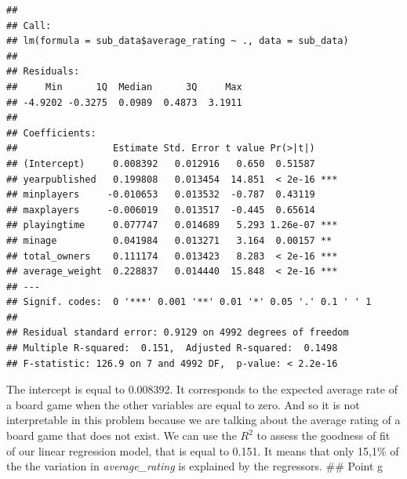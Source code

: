 \documentclass[
]{article}
\newenvironment{Shaded}{\begin{snugshade}}{\end{snugshade}}
\newcommand{\AttributeTok}[1]{\textcolor[rgb]{0.77,0.63,0.00}{#1}}
\newcommand{\ConstantTok}[1]{\textcolor[rgb]{0.00,0.00,0.00}{#1}}
\newcommand{\DecValTok}[1]{\textcolor[rgb]{0.00,0.00,0.81}{#1}}
\newcommand{\FunctionTok}[1]{\textcolor[rgb]{0.00,0.00,0.00}{#1}}
\newcommand{\NormalTok}[1]{#1}
\newcommand{\OtherTok}[1]{\textcolor[rgb]{0.56,0.35,0.01}{#1}}
\newcommand{\SpecialCharTok}[1]{\textcolor[rgb]{0.00,0.00,0.00}{#1}}
\begin{document}
\begin{Shaded}
\end{Shaded}

\begin{verbatim}
## 
## Call:
## lm(formula = sub_data$average_rating ~ ., data = sub_data)
## 
## Residuals:
##     Min      1Q  Median      3Q     Max 
## -4.9202 -0.3275  0.0989  0.4873  3.1911 
## 
## Coefficients:
##                 Estimate Std. Error t value Pr(>|t|)    
## (Intercept)     0.008392   0.012916   0.650  0.51587    
## yearpublished   0.199808   0.013454  14.851  < 2e-16 ***
## minplayers     -0.010653   0.013532  -0.787  0.43119    
## maxplayers     -0.006019   0.013517  -0.445  0.65614    
## playingtime     0.077747   0.014689   5.293 1.26e-07 ***
## minage          0.041984   0.013271   3.164  0.00157 ** 
## total_owners    0.111174   0.013423   8.283  < 2e-16 ***
## average_weight  0.228837   0.014440  15.848  < 2e-16 ***
## ---
## Signif. codes:  0 '***' 0.001 '**' 0.01 '*' 0.05 '.' 0.1 ' ' 1
## 
## Residual standard error: 0.9129 on 4992 degrees of freedom
## Multiple R-squared:  0.151,  Adjusted R-squared:  0.1498 
## F-statistic: 126.9 on 7 and 4992 DF,  p-value: < 2.2e-16
\end{verbatim}

The intercept is equal to 0.008392. It corresponds to the expected
average rate of a board game when the other variables are equal to zero.
And so it is not interpretable in this problem because we are talking
about the average rating of a board game that does not exist. We can use
the \(R^2\) to assess the goodness of fit of our linear regression
model, that is equal to 0.151. It means that only 15,1\% of the the
variation in \emph{average\_rating} is explained by the regressors. \#\#
Point g
\end{document}
